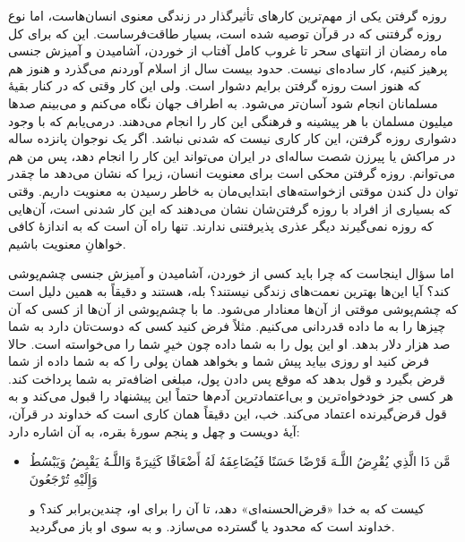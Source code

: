 روزه گرفتن یکی از مهم‌ترین کارهای تأثیرگذار در زندگی معنوی انسان‌هاست، اما نوع روزه گرفتنی که در قرآن توصیه شده است، بسیار طاقت‌فرساست. این که برای کل ماه رمضان از انتهای سحر تا غروب کامل آفتاب از خوردن، آشامیدن و آمیزش جنسی پرهیز کنیم، کار ساده‌ای نیست. حدود بیست سال از اسلام آوردنم می‌گذرد و هنوز هم که هنوز است روزه گرفتن برایم دشوار است. ولی این کار وقتی که در کنار بقیهٔ مسلمانان انجام شود آسان‌تر ‌‌می‌شود. به اطراف جهان نگاه ‌می‌کنم و ‌‌می‌بینم صدها میلیون مسلمان با هر پیشینه و فرهنگی این کار را انجام می‌دهند. درمی‌یابم که  با وجود دشواری روزه گرفتن،  این کار کاری نیست که شدنی نباشد. اگر یک نوجوان پانزده ساله در مراکش یا پیرزن شصت ساله‌ای در ایران می‌تواند این کار را انجام دهد، پس من هم می‌توانم. روزه گرفتن محکی است برای معنویت انسان، زیرا که نشان می‌دهد  ما چقدر توان  دل کندن موقتی  ازخواسته‌های ابتدایی‌مان به خاطر رسیدن به معنویت داریم. وقتی که بسیاری از افراد با روزه گرفتن‌شان نشان می‌دهند که این کار شدنی است، آن‌هایی که روزه نمی‌گیرند دیگر عذری پذیرفتنی ندارند. تنها راه آن است که به اندازهٔ کافی خواهانِ معنویت باشیم.


اما سؤال اینجاست که چرا باید کسی از خوردن، آشامیدن و آمیزش جنسی چشم‌پوشی کند؟ آیا این‌ها بهترین نعمت‌های زندگی نیستند؟ بله، هستند و دقیقاً به همین دلیل است که چشم‌پوشی موقتی از آن‌ها معنادار می‌شود. ما با چشم‌پوشی از آن‌ها از کسی که آن چیزها را به ما داده قدردانی می‌کنیم. مثلاً فرض کنید کسی که دوست‌تان دارد به شما صد هزار دلار بدهد. او این پول را به شما داده چون خیرِ شما را می‌خواسته است. حالا فرض کنید او روزی بیاید پیش شما و بخواهد همان پولی را که به شما داده از شما قرض بگیرد و قول بدهد که موقع پس دادن پول، مبلغی اضافه‌تر به شما پرداخت کند. هر کسی جز خودخواه‌ترین و بی‌اعتمادترین آدم‌ها حتماً این پیشنهاد را قبول می‌کند و به قول قرض‌گیرنده اعتماد می‌کند. خب، این دقیقاً همان کاری است که خداوند در قرآن، آیهٔ دویست و چهل و پنجم سورهٔ بقره، به آن اشاره دارد:

\begin{itemize}
	\item[]
	{
		مَّن ذَا الَّذِي يُقْرِضُ اللَّـهَ قَرْضًا حَسَنًا فَيُضَاعِفَهُ لَهُ أَضْعَافًا كَثِيرَةً  وَاللَّـهُ يَقْبِضُ وَيَبْسُطُ وَإِلَيْهِ تُرْجَعُونَ}
	
	{
		کیست که به خدا «قرض‌الحسنه‌ای» دهد،  تا آن را برای او، چندین‌برابر کند؟ و خداوند است که محدود یا گسترده می‌سازد. و به سوی او باز می‌گردید.}
\end{itemize}


